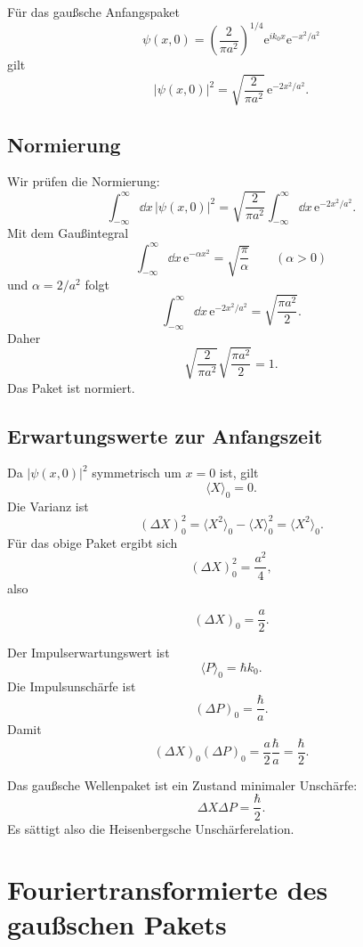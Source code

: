 \begin{formulabox}
Für das gaußsche Anfangspaket
\[
    \psi(x,0)=\left(\frac{2}{\pi a^2}\right)^{1/4}
    \mathrm{e}^{ik_0x}\mathrm{e}^{-x^2/a^2}
\]
gilt
\[
    |\psi(x,0)|^2=\sqrt{\frac{2}{\pi a^2}}\,\mathrm{e}^{-2x^2/a^2}.
\]
\end{formulabox}

\subsection{Normierung}

\begin{derivationbox}
Wir prüfen die Normierung:
\[
    \int_{-\infty}^{\infty}\dd x\,|\psi(x,0)|^2
    =\sqrt{\frac{2}{\pi a^2}}\int_{-\infty}^{\infty}\dd x\,
      \mathrm{e}^{-2x^2/a^2}.
\]
Mit dem Gaußintegral
\[
    \int_{-\infty}^{\infty}\dd x\,\mathrm{e}^{-\alpha x^2}
    =\sqrt{\frac{\pi}{\alpha}}
    \qquad (\alpha>0)
\]
und $\alpha=2/a^2$ folgt
\[
    \int_{-\infty}^{\infty}\dd x\,\mathrm{e}^{-2x^2/a^2}
    =\sqrt{\frac{\pi a^2}{2}}.
\]
Daher
\[
    \sqrt{\frac{2}{\pi a^2}}\sqrt{\frac{\pi a^2}{2}}=1.
\]
Das Paket ist normiert.
\end{derivationbox}

\subsection{Erwartungswerte zur Anfangszeit}

Da $|\psi(x,0)|^2$ symmetrisch um $x=0$ ist, gilt
\[
    \langle X\rangle_0=0.
\]
Die Varianz ist
\[
    (\Delta X)_0^2=\langle X^2\rangle_0-\langle X\rangle_0^2
    =\langle X^2\rangle_0.
\]
Für das obige Paket ergibt sich
\[
    (\Delta X)_0^2=\frac{a^2}{4},
\]
also
\begin{formulabox}
\[
    (\Delta X)_0=\frac{a}{2}.
\]
\end{formulabox}

Der Impulserwartungswert ist
\[
    \langle P\rangle_0=\hbar k_0.
\]
Die Impulsunschärfe ist
\[
    (\Delta P)_0=\frac{\hbar}{a}.
\]
Damit
\[
    (\Delta X)_0(\Delta P)_0=\frac{a}{2}\frac{\hbar}{a}=\frac{\hbar}{2}.
\]

\begin{conceptbox}
Das gaußsche Wellenpaket ist ein Zustand minimaler Unschärfe:
\[
    \Delta X\Delta P=\frac{\hbar}{2}.
\]
Es sättigt also die Heisenbergsche Unschärferelation.
\end{conceptbox}

\section{Fouriertransformierte des gaußschen Pakets}

